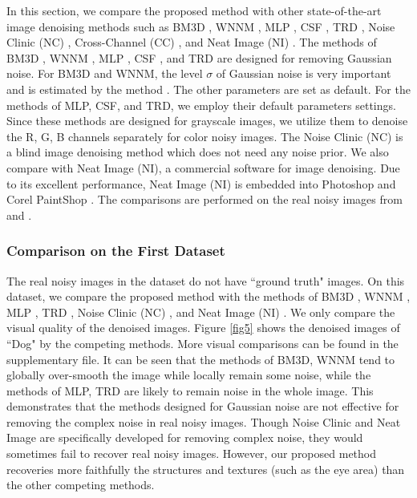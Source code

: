 \documentclass[10pt,twocolumn,letterpaper]{article}
\begin{document}
In this section, we compare the proposed method with other state-of-the-art image denoising methods such as BM3D \cite{bm3d}, WNNM \cite{wnnm}, MLP \cite{mlp}, CSF \cite{csf}, TRD \cite{chen2015learning}, Noise Clinic (NC) \cite{noiseclinic}, Cross-Channel (CC) \cite{crosschannel2016}, and Neat Image (NI) \cite{neatimage}. The methods of BM3D \cite{bm3d}, WNNM \cite{wnnm}, MLP \cite{mlp}, CSF \cite{csf}, and TRD \cite{chen2015learning} are designed for removing Gaussian noise. For BM3D and WNNM, the level $\sigma$ of Gaussian noise is very important and is estimated by the method \cite{noiselevel}. The other parameters are set as default. For the methods of MLP, CSF, and TRD, we employ their default parameters settings. Since these methods are designed for grayscale images, we utilize them to denoise the R, G, B channels separately for color noisy images. The Noise Clinic (NC) \cite{noiseclinic} is a blind image denoising method which does not need any noise prior. We also compare with Neat Image (NI), a commercial software for image denoising. Due to its excellent performance, Neat Image (NI) is embedded into Photoshop and Corel PaintShop \cite{neatimage}. The comparisons are performed on the real noisy images from \cite{ncwebsite} and \cite{crosschannel2016}.

\subsubsection{Comparison on the First Dataset \cite{ncwebsite}}

The real noisy images in the dataset \cite{ncwebsite} do not have ``ground truth" images. On this dataset, we compare the proposed method with the methods of BM3D \cite{bm3d}, WNNM \cite{wnnm}, MLP \cite{mlp}, TRD \cite{chen2015learning}, Noise Clinic (NC) \cite{noiseclinic}, and Neat Image (NI) \cite{neatimage}. We only compare the visual quality of the denoised images. Figure \ref{fig5} shows the denoised images of ``Dog" by the competing methods. More visual comparisons can be found in the supplementary file. It can be seen that the methods of BM3D, WNNM tend to globally over-smooth the image while locally remain some noise, while the methods of MLP, TRD are likely to remain noise in the whole image. This demonstrates that the methods designed for Gaussian noise are not effective for removing the complex noise in real noisy images. Though Noise Clinic and Neat Image are specifically developed for removing complex noise, they would sometimes fail to recover real noisy images. However, our proposed method recoveries more faithfully the structures and textures (such as the eye area) than the other competing methods.
\end{document}
